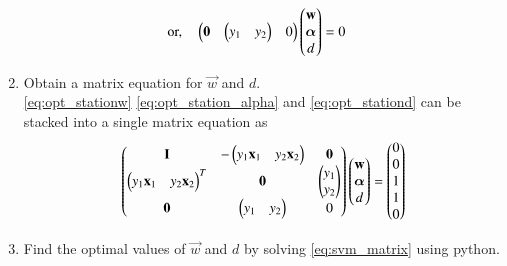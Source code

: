 \documentclass[journal,12pt,twocolumn]{IEEEtran}
\renewcommand\thesection{\arabic{section}}
\begin{document}
\begin{enumerate}[label=\thesection.\arabic*,ref=\thesection.\theenumi]
\begin{align}
\text{or,}\quad \begin{pmatrix}\mathbf{0}& \begin{pmatrix}y_1&y_2\end{pmatrix} & 0\end{pmatrix} \begin{pmatrix}\mathbf{w} 
\\\bm{\alpha} \\ d\end{pmatrix}&=0
\label{eq:opt_stationd}
\end{align}
%
\item Obtain a matrix equation  for $\vec{w}$ and $d$.
\\
\solution 
\eqref{eq:opt_stationw}
\eqref{eq:opt_station_alpha} and 
\eqref{eq:opt_stationd} can be stacked into a single matrix equation as
{\small
\begin{align}
\label{eq:svm_matrix}
\begin{pmatrix}\mathbf{I} & -\begin{pmatrix}y_1\mathbf{x}_1 & y_2\mathbf{x}_2\end{pmatrix} & \mathbf{0}
\\
\begin{pmatrix}y_1\mathbf{x}_1&y_2\mathbf{x}_2\end{pmatrix}^T & \mathbf{0} & \begin{pmatrix}y_1 \\ y_2\end{pmatrix}
\\
\mathbf{0}& \begin{pmatrix}y_1&y_2\end{pmatrix} & 0\end{pmatrix} 
\begin{pmatrix}\mathbf{w} 
\\\bm{\alpha} \\ d\end{pmatrix}=\begin{pmatrix}0 \\ 0 \\1\\1\\0\end{pmatrix} 
\end{align}
}
\item Find the optimal values of $\vec{w}$ and $d$ by solving \eqref{eq:svm_matrix} using python.

\end{enumerate}
\end{document}
